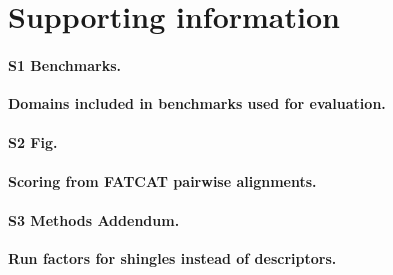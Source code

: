\documentclass[10pt,letterpaper]{article}
\begin{document}
\section*{Supporting information}

\paragraph*{S1 Benchmarks.}
\label{S1_Benchmarks}
{\bf Domains included in benchmarks used for evaluation.} 

\paragraph*{S2 Fig.}
\label{S2_Fig}
{\bf Scoring from FATCAT pairwise alignments.} 

\paragraph*{S3 Methods Addendum.}
\label{S3_Methods}
{\bf Run factors for shingles instead of descriptors.} 


\nolinenumbers

%
%
% 

\nocite{Ayoub2017}
\nocite{BioJava2012}

\end{document}
